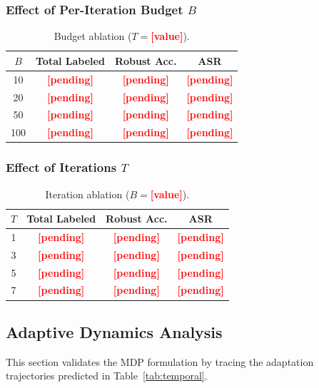 \documentclass[review,1p,times,number]{elsarticle}
\newcommand{\TODO}[1]{\textcolor{red}{\textbf{[#1]}}}
\begin{document}
\subsubsection{Effect of Per-Iteration Budget $B$}

\begin{table}[htbp]
\caption{Budget ablation ($T{=}$\TODO{value}).}
\label{tab:ablation_budget}
\centering
\begin{tabular}{@{}cccc@{}}
\toprule
$B$ & Total Labeled & Robust Acc. & ASR \\
\midrule
10  & \TODO{pending} & \TODO{pending} & \TODO{pending} \\
20  & \TODO{pending} & \TODO{pending} & \TODO{pending} \\
50  & \TODO{pending} & \TODO{pending} & \TODO{pending} \\
100 & \TODO{pending} & \TODO{pending} & \TODO{pending} \\
\bottomrule
\end{tabular}
\end{table}

\subsubsection{Effect of Iterations $T$}

\begin{table}[htbp]
\caption{Iteration ablation ($B{=}$\TODO{value}).}
\label{tab:ablation_iters}
\centering
\begin{tabular}{@{}cccc@{}}
\toprule
$T$ & Total Labeled & Robust Acc. & ASR \\
\midrule
1 & \TODO{pending} & \TODO{pending} & \TODO{pending} \\
3 & \TODO{pending} & \TODO{pending} & \TODO{pending} \\
5 & \TODO{pending} & \TODO{pending} & \TODO{pending} \\
7 & \TODO{pending} & \TODO{pending} & \TODO{pending} \\
\bottomrule
\end{tabular}
\end{table}

\subsection{Adaptive Dynamics Analysis}
\label{sec:dynamics_exp}

This section validates the MDP formulation by tracing the
adaptation trajectories predicted in Table~\ref{tab:temporal}.
\end{document}
